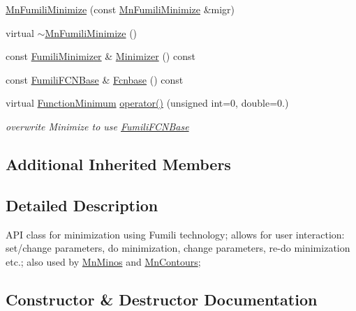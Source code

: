 \begin{DoxyCompactItemize}
\mbox{\hyperlink{classROOT_1_1Minuit2_1_1MnFumiliMinimize_a082eb87753b71a4d383ff8d735dc8410}{Mn\+Fumili\+Minimize}} (const \mbox{\hyperlink{classROOT_1_1Minuit2_1_1MnFumiliMinimize}{Mn\+Fumili\+Minimize}} \&migr)
\item 
virtual \mbox{\hyperlink{classROOT_1_1Minuit2_1_1MnFumiliMinimize_ab999713e15397b9373551207f05786c5}{$\sim$\+Mn\+Fumili\+Minimize}} ()
\item 
const \mbox{\hyperlink{classROOT_1_1Minuit2_1_1FumiliMinimizer}{Fumili\+Minimizer}} \& \mbox{\hyperlink{classROOT_1_1Minuit2_1_1MnFumiliMinimize_a96eb0cf96ae7ec874f912b6d2b3e7990}{Minimizer}} () const
\item 
const \mbox{\hyperlink{classROOT_1_1Minuit2_1_1FumiliFCNBase}{Fumili\+F\+C\+N\+Base}} \& \mbox{\hyperlink{classROOT_1_1Minuit2_1_1MnFumiliMinimize_a4540fd0311c15810965864988d4c70d1}{Fcnbase}} () const
\item 
virtual \mbox{\hyperlink{classROOT_1_1Minuit2_1_1FunctionMinimum}{Function\+Minimum}} \mbox{\hyperlink{classROOT_1_1Minuit2_1_1MnFumiliMinimize_a58da42cb9def0b42c424a3121987e77b}{operator()}} (unsigned int=0, double=0.)
\begin{DoxyCompactList}\small\item\em overwrite Minimize to use \mbox{\hyperlink{classROOT_1_1Minuit2_1_1FumiliFCNBase}{Fumili\+F\+C\+N\+Base}} \end{DoxyCompactList}\end{DoxyCompactItemize}
\subsection*{Additional Inherited Members}


\subsection{Detailed Description}
A\+PI class for minimization using Fumili technology; allows for user interaction\+: set/change parameters, do minimization, change parameters, re-\/do minimization etc.; also used by \mbox{\hyperlink{classROOT_1_1Minuit2_1_1MnMinos}{Mn\+Minos}} and \mbox{\hyperlink{classROOT_1_1Minuit2_1_1MnContours}{Mn\+Contours}}; 

\subsection{Constructor \& Destructor Documentation}
\mbox{\label{classROOT_1_1Minuit2_1_1MnFumiliMinimize_a2e8cffba3a44be7488ead2240a1d3149}} 

